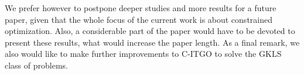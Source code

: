 
We prefer however to postpone deeper studies and more results for a future paper, given that the whole focus of the current work is about constrained optimization. Also, a considerable part of the paper would have to be devoted to present these results, what would increase the paper length. As a final remark, we also would like to make further improvements to C-ITGO to solve the GKLS class of problems.
